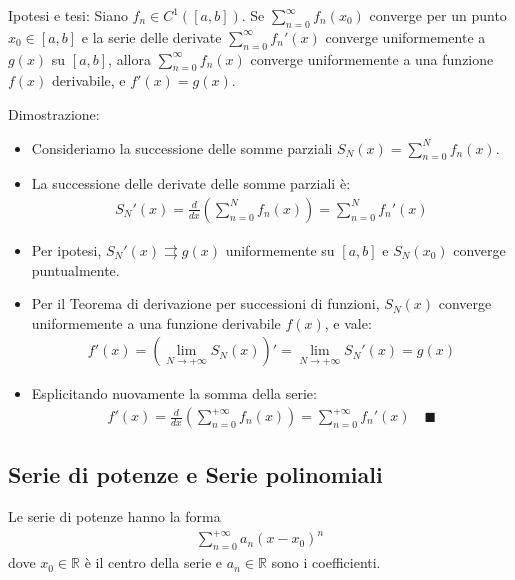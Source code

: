 \documentclass[letterpaper,10pt,italian]{jupyterBook}
\begin{document}
\sphinxAtStartPar
Ipotesi e tesi: Siano \(f_n \in C^1([a,b])\). Se \(\sum_{n=0}^\infty f_n(x_0)\) converge per un punto \(x_0 \in [a,b]\) e la serie delle derivate \(\sum_{n=0}^\infty f_n'(x)\) converge uniformemente a \(g(x)\) su \([a,b]\), allora \(\sum_{n=0}^\infty f_n(x)\) converge uniformemente a una funzione \(f(x)\) derivabile, e \(f'(x) = g(x)\).

\sphinxAtStartPar
Dimostrazione:
\begin{itemize}
\item {} 
\sphinxAtStartPar
Consideriamo la successione delle somme parziali \(S_N(x) = \sum_{n=0}^N f_n(x)\).

\item {} 
\sphinxAtStartPar
La successione delle derivate delle somme parziali è:
\begin{equation*}
\begin{split}S_N'(x) = \frac{d}{dx} \left( \sum_{n=0}^N f_n(x) \right) = \sum_{n=0}^N f_n'(x)\end{split}
\end{equation*}
\item {} 
\sphinxAtStartPar
Per ipotesi, \(S_N'(x) \rightrightarrows g(x)\) uniformemente su \([a,b]\) e \(S_N(x_0)\) converge puntualmente.

\item {} 
\sphinxAtStartPar
Per il Teorema di derivazione per successioni di funzioni, \(S_N(x)\) converge uniformemente a una funzione derivabile \(f(x)\), e vale:
\begin{equation*}
\begin{split}f'(x) = \left( \lim_{N \to +\infty} S_N(x) \right)' = \lim_{N \to +\infty} S_N'(x) = g(x)\end{split}
\end{equation*}
\item {} 
\sphinxAtStartPar
Esplicitando nuovamente la somma della serie:
\begin{equation*}
\begin{split}f'(x) = \frac{d}{dx} \left( \sum_{n=0}^{+\infty} f_n(x) \right) = \sum_{n=0}^{+\infty} f_n'(x) \quad \blacksquare\end{split}
\end{equation*}
\end{itemize}


\subsection{Serie di potenze e Serie polinomiali}
\label{\detokenize{ch/series/series-functions-real:serie-di-potenze-e-serie-polinomiali}}
\sphinxAtStartPar
Le serie di potenze hanno la forma
\begin{equation*}
\begin{split}\sum_{n=0}^{+\infty} a_n (x - x_0)^n\end{split}
\end{equation*}
\sphinxAtStartPar
dove \(x_0 \in \mathbb{R}\) è il centro della serie e \(a_n \in \mathbb{R}\) sono i coefficienti.
\end{document}
